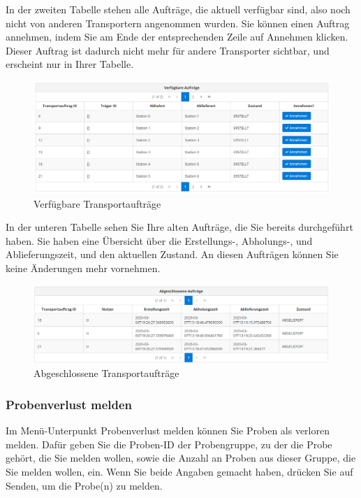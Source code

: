 \documentclass[enabledeprecatedfontcommands,fontsize=12pt,paper=a4,twoside]{scrartcl}
\begin{document}
In der zweiten Tabelle stehen alle Aufträge, die aktuell verfügbar sind, also noch nicht von anderen Transportern angenommen wurden. Sie können einen Auftrag annehmen, indem Sie am Ende der entsprechenden Zeile auf Annehmen klicken. Dieser Auftrag ist dadurch nicht mehr für andere Transporter sichtbar, und erscheint nur in Ihrer Tabelle. \\

\begin{figure}[h!]
\begin{center}
 \includegraphics[width=\textwidth]{screenshots/tr/verfuegbar.png}
  \caption{Verfügbare Transportaufträge}
  \label{fig:boat2}
\end{center}
\end{figure}


In der unteren Tabelle sehen Sie Ihre alten Aufträge, die Sie bereits durchgeführt haben. Sie haben eine Übersicht über die Erstellungs-, Abholungs-, und Ablieferungszeit, und den aktuellen Zustand. An diesen Aufträgen können Sie keine Änderungen mehr vornehmen. \\

\begin{figure}[h!]
\begin{center}
 \includegraphics[width=\textwidth]{screenshots/tr/abgeschlossen.png}
  \caption{Abgeschlossene Transportaufträge}
  \label{fig:boat2}
\end{center}
\end{figure}


\subsubsection{Probenverlust melden}
Im Menü-Unterpunkt Probenverlust melden können Sie Proben als verloren melden. Dafür geben Sie die Proben-ID der Probengruppe, zu der die Probe gehört, die Sie melden wollen, sowie die Anzahl an Proben aus dieser Gruppe, die Sie melden wollen, ein. Wenn Sie beide Angaben gemacht haben, drücken Sie auf Senden, um die Probe(n) zu melden. \\
\end{document}
